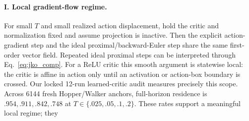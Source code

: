 \documentclass[twoside]{article}
\begin{document}
\paragraph{I. Local gradient-flow regime.}
For small $T$ and small realized action displacement, hold the critic and normalization fixed and assume projection is inactive. Then the explicit action-gradient step and the ideal proximal/backward-Euler step share the same first-order vector field. Repeated ideal proximal steps can be interpreted through Eq.~\eqref{eq:jko_comp}. For a ReLU critic this smooth argument is statewise local: the critic is affine in action only until an activation or action-box boundary is crossed. Our locked 12-run learned-critic audit measures precisely this scope. Across 6144 fresh Hopper/Walker anchors, full-horizon residence is $.954,.911,.842,.748$ at $T\in\{.025,.05,.1,.2\}$. These rates support a meaningful local regime; they
\end{document}
